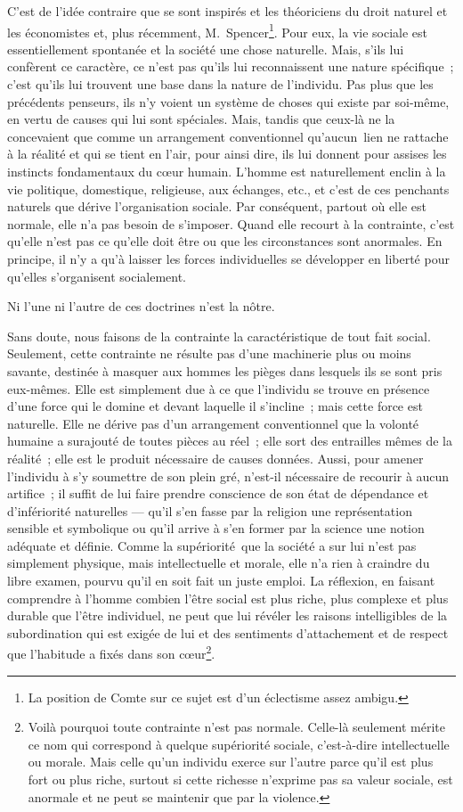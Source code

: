 \documentclass[french,twoside]{book} %
\begin{document}
C’est de l’idée contraire que se sont inspirés et les théoriciens du droit naturel et les économistes et, plus récemment, M. Spencer\footnote{ La position de Comte sur ce sujet est d’un éclectisme assez ambigu.}. Pour eux, la vie sociale est essentiellement spontanée et la société une chose naturelle. Mais, s’ils lui confèrent ce caractère, ce n’est pas qu’ils lui reconnaissent une nature spécifique ; c’est qu’ils lui trouvent une base dans la nature de l’individu. Pas plus que les précédents penseurs, ils n’y voient un système de choses qui existe par soi-même, en vertu de causes qui lui sont spéciales. Mais, tandis que ceux-là ne la concevaient que comme un arrangement conventionnel qu’aucun lien ne rattache à la réalité et qui se tient en l’air, pour ainsi dire, ils lui donnent pour assises les instincts fondamentaux du cœur humain. L’homme est naturellement enclin à la vie politique, domestique, religieuse, aux échanges, etc., et c’est de ces penchants naturels que dérive l’organisation sociale. Par conséquent, partout où elle est normale, elle n’a pas besoin de s’imposer. Quand elle recourt à la contrainte, c’est qu’elle n’est pas ce qu’elle doit être ou que les circonstances sont anormales. En principe, il n’y a qu’à laisser les forces individuelles se développer en liberté pour qu’elles s’organisent socialement.\par
Ni l’une ni l’autre de ces doctrines n’est la nôtre.\par
Sans doute, nous faisons de la contrainte la caractéristique de tout fait social. Seulement, cette contrainte ne résulte pas d’une machinerie plus ou moins savante, destinée à masquer aux hommes les pièges dans lesquels ils se sont pris eux-mêmes. Elle est simplement due à ce que l’individu se trouve en présence d’une force qui le domine et devant laquelle il s’incline ; mais cette force est naturelle. Elle ne dérive pas d’un arrangement conventionnel que la volonté humaine a surajouté de toutes pièces au réel ; elle sort des entrailles mêmes de la réalité ; elle est le produit nécessaire de causes données. Aussi, pour amener l’individu à s’y soumettre de son plein gré, n’est-il nécessaire de recourir à aucun artifice ; il suffit de lui faire prendre conscience de son état de dépendance et d’infériorité naturelles — qu’il s’en fasse par la religion une représentation sensible et symbolique ou qu’il arrive à s’en former par la science une notion adéquate et définie. Comme la supériorité que la société a sur lui n’est pas simplement physique, mais intellectuelle et morale, elle n’a rien à craindre du libre examen, pourvu qu’il en soit fait un juste emploi. La réflexion, en faisant comprendre à l’homme combien l’être social est plus riche, plus complexe et plus durable que l’être individuel, ne peut que lui révéler les raisons intelligibles de la subordination qui est exigée de lui et des sentiments d’attachement et de respect que l’habitude a fixés dans son cœur\footnote{ Voilà pourquoi toute contrainte n’est pas normale. Celle-là seulement mérite ce nom qui correspond à quelque supériorité sociale, c’est-à-dire intellectuelle ou morale. Mais celle qu’un individu exerce sur l’autre parce qu’il est plus fort ou plus riche, surtout si cette richesse n’exprime pas sa valeur sociale, est anormale et ne peut se maintenir que par la violence.}.\par
\end{document}
